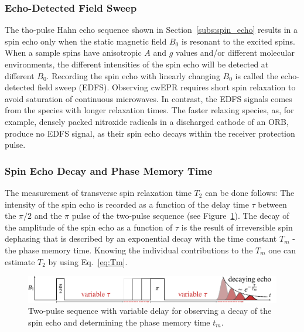 \subsubsection{Echo-Detected Field Sweep}
The tho-pulse Hahn echo sequence shown in Section~\ref{subs:spin_echo} results in a spin echo only when the static magnetic field $B_0$ is resonant to the excited spins. When a sample spins have anisotropic $A$ and $g$ values and/or different molecular environments, the different intensities of the spin echo will be detected at different $B_0$. Recording the spin echo with linearly changing $B_0$ is called the echo-detected field sweep (EDFS). Observing cwEPR requires short spin relaxation to avoid saturation of continuous microwaves. In contrast, the EDFS signals comes from the species with longer relaxation times. The faster relaxing species, as, for example, densely packed nitroxide radicals in a discharged cathode of an ORB, produce no EDFS signal, as their spin echo decays within the receiver protection pulse.

\subsubsection{Spin Echo Decay and Phase Memory Time}
The measurement of transverse spin relaxation time $T_2$ can be done follows: The intensity of the spin echo is recorded as a function of the delay time $\tau$ between the $\pi/2$ and the $\pi$ pulse of the two-pulse sequence (see Figure~\ref{fig:Tm_diagram}). The decay of the amplitude of the spin echo as a function of $\tau$ is the result of irreversible spin dephasing that is described by an exponential decay with the time constant $T_m$ - the phase memory time. Knowing the individual contributions to the $T_m$ one can estimate $T_2$ by using Eq.~\ref{eq:Tm}.

\begin{figure}[h]
\center
	\includegraphics[width=1\textwidth]{./epr_basics/echo_decay.pdf}
	\caption{Two-pulse sequence with variable delay for observing a decay of the spin echo and determining the phase memory time $t_m$.}
	\label{fig:Tm_diagram}
\end{figure}

